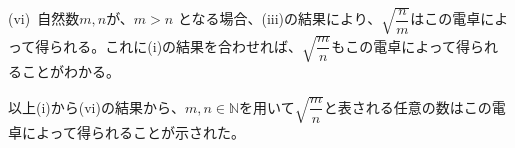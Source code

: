 (vi)~自然数$m, n$が、$m > n$ となる場合、(iii)の結果により、$\sqrt{\dfrac{n}{m}}$はこの電卓によって得られる。これに(i)の結果を合わせれば、$\sqrt{\dfrac{m}{n}}$もこの電卓によって得られることがわかる。

以上(i)から(vi)の結果から、$m, n\in\mathbb{N}$を用いて$\sqrt{\dfrac{m}{n}}$と表される任意の数はこの電卓によって得られることが示された。

